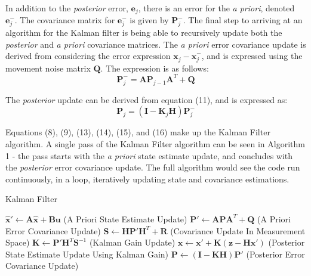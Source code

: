 \documentclass[a4paper]{article}
\begin{document}
In addition to the \textit{posterior} error, $\mathbf{e}_j$, there is an error for the \textit{a priori}, denoted $\mathbf{e}^-_j$. The covariance matrix for $\mathbf{e}^-_j$ is given by $\mathbf{P}^-_j$. The final step to arriving at an algorithm for the Kalman filter is being able to recursively update both the \textit{posterior} and \textit{a priori} covariance matrices. The \textit{a priori} error covariance update is derived from considering the error expression $\mathbf{x}_j - \hat{\mathbf{x}}^-_j$, and is expressed using the movement noise matrix $\mathbf{Q}$. The expression is as follows:
\begin{equation}
\mathbf{P}^-_j = \mathbf{A} \mathbf{P}_{j-1} \mathbf{A}^T + \mathbf{Q}
\end{equation}

The \textit{posterior} update can be derived from equation (11), and is expressed as:
\begin{equation}
\mathbf{P}_j = (\mathbf{I} - \mathbf{K}_j \mathbf{H}) \mathbf{P}^-_j
\end{equation}

Equations (8), (9), (13), (14), (15), and (16) make up the Kalman Filter algorithm. A single pass of the Kalman Filter algorithm can be seen in Algorithm 1 - the pass starts with the \textit{a priori} state estimate update, and concludes with the \textit{posterior} error covariance update. The full algorithm would see the code run continuously, in a loop, iteratively updating state and covariance estimations.
\begin{algorithm}
\caption{Kalman Filter}
\begin{algorithmic}[1]
\State $\hat{\mathbf{x}}' \gets \mathbf{A} \hat{\mathbf{x}} + \mathbf{B} \mathbf{u}$ (A Priori State Estimate Update)
\State $\mathbf{P}' \gets \mathbf{A} \mathbf{P} \mathbf{A}^T + \mathbf{Q}$ (A Priori Error Covariance Update)
\State $\mathbf{S} \gets \mathbf{H} \mathbf{P}' \mathbf{H}^T + \mathbf{R}$ (Covariance Update In Measurement Space)
\State $\mathbf{K} \gets \mathbf{P}' \mathbf{H}^T \mathbf{S}^{-1}$ (Kalman Gain Update)
\State $\mathbf{x} \gets \mathbf{x}' + \mathbf{K}(\mathbf{z} - \mathbf{H} \mathbf{x}')$ (Posterior State Estimate Update Using Kalman Gain)
\State $\mathbf{P} \gets (\mathbf{I} - \mathbf{K} \mathbf{H}) \mathbf{P}'$ (Posterior Error Covariance Update)
\end{algorithmic}
\end{algorithm}
\end{document}
